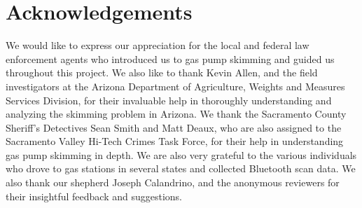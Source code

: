 
\section{Acknowledgements}
\label{sec:acknowledgement}

We would like to express our appreciation for the local and federal law enforcement
agents who introduced us to gas pump skimming and guided us throughout this
project.
%
We also like to thank Kevin Allen, and the field investigators at the Arizona
Department of Agriculture, Weights and Measures Services Division, for their
invaluable help in thoroughly understanding and analyzing the skimming problem in Arizona.
%
We thank the Sacramento County Sheriff’s Detectives Sean Smith and Matt
Deaux, who are also assigned to the Sacramento Valley Hi-Tech Crimes Task Force,
for their help in understanding gas pump skimming in depth.
%
We are also very grateful to the various individuals who drove to gas stations
in several states and collected Bluetooth scan data.
%
We also thank our shepherd Joseph Calandrino, and the anonymous reviewers for
their insightful feedback and suggestions.
